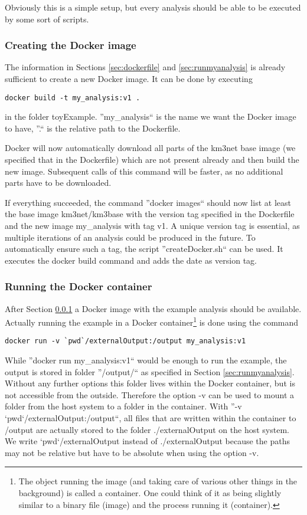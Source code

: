 \documentclass[a4paper, twoside, 11pt]{article}
\begin{document}
Obviously this is a simple setup, but every analysis should be able to be executed by some sort of scripts. 

\subsubsection{Creating the Docker image}
\label{sec:createImage}
The information in Sections \ref{sec:dockerfile} and \ref{sec:runmyanalysis} 
is already sufficient to create a new Docker image. 
It can be done by executing
\begin{lstlisting}[basicstyle=\footnotesize\ttfamily,frame=single]
docker build -t my_analysis:v1 .
\end{lstlisting}
in the folder toyExample. 
''my\_analysis`` is the name we want the Docker image to have, 
''.`` is the relative path to the Dockerfile.

Docker will now automatically download all parts of the km3net base image 
(we specified that in the Dockerfile)
which are not present already and then build the new image. 
Subsequent calls of this command will be faster, as no additional parts have to be downloaded. 

If everything succeeded, the command ''docker images`` 
should now list at least the base image km3net/km3base 
with the version tag specified in the Dockerfile and 
the new image my\_analysis with tag v1. 
A unique version tag is essential, as multiple iterations of an analysis could be produced in the future. 
To automatically ensure such a tag, the script ''createDocker.sh`` can be used.
It executes the docker build command and adds the date as version tag. 


\subsubsection{Running the Docker container}
\label{sec:runContainer}

After Section \ref{sec:createImage} a Docker image with the example analysis should be available. 
Actually running the example in a Docker container\footnote{The object running the image 
(and taking care of various other things in the background) is called a container. 
One could think of it as being slightly similar to a binary file (image) and the process running it (container).} 
is done using the command 
\begin{lstlisting}[basicstyle=\footnotesize\ttfamily,frame=single]
docker run -v `pwd`/externalOutput:/output my_analysis:v1
\end{lstlisting}
While ''docker run my\_analysis:v1``
would be enough to run the example, the output is stored in folder 
''/output/`` as specified in Section \ref{sec:runmyanalysis}.
Without any further options this folder lives within the Docker container, but is not accessible from the outside. 
Therefore the option -v can be used to mount a folder from the host system to a folder in the container. 
With ''-v `pwd`/externalOutput:/output``, all files that are written within the container to /output 
are actually stored to the folder ./externalOutput on the host system. 
We write `pwd`/externalOutput instead of ./externalOutput because the 
paths may not be relative but have to be absolute when using the option -v. 
\end{document}
